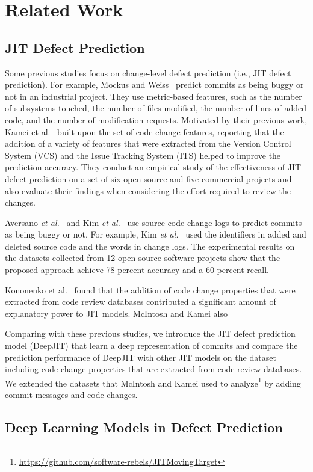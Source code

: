 \section{Related Work}
\label{sec:related}
\subsection{JIT Defect Prediction}
Some previous studies focus on change-level defect prediction (i.e., JIT defect prediction). For example, Mockus and Weiss~\cite{Mockus2000} predict commits as being buggy or not in an industrial project. They use metric-based features, such as the number of subsystems touched, the number of files modified, the number of lines of added code, and the number of modification requests. Motivated by their previous work, Kamei et al.~\cite{Kamei:2013:LES} built upon the set of code change features, reporting that the addition of a variety of features that were extracted from the Version Control System (VCS) and the Issue Tracking System (ITS) helped to improve the prediction accuracy. They conduct an empirical study of the effectiveness of JIT defect prediction on a set of six open source and five commercial projects and also evaluate their findings when considering the effort required to review the changes.

Aversano \emph{et al.}~\cite{Aversano2007} and Kim \emph{et al.}~\cite{Kim2008} use source code change logs to predict commits as being buggy or not. For example, Kim \emph{et al.}~\cite{Kim2008} used the identifiers in added and deleted source code and the words in change logs. The experimental results on the datasets collected from 12 open source software projects show that the proposed approach achieve 78 percent accuracy and a 60 percent recall.

Kononenko et al.~\cite{Kononenko:2015} found that the addition of code change properties that were extracted from code review databases contributed a significant amount of explanatory power to JIT models. McIntosh and Kamei also 

Comparing with these previous studies, we introduce the JIT defect prediction model (DeepJIT) that learn a deep representation of commits and compare the prediction performance of DeepJIT with other JIT models on the dataset including code change properties that are extracted from code review databases. We extended the datasets that McIntosh and Kamei used to analyze\footnote{\url{https://github.com/software-rebels/JITMovingTarget}} by adding commit messages and code changes. 

\subsection{Deep Learning Models in Defect Prediction}



